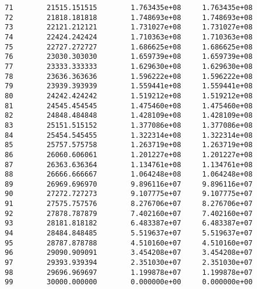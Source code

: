 \documentclass[11pt]{article}
\begin{document}
\begin{verbatim}
71        21515.151515        1.763435e+08     1.763435e+08   
72        21818.181818        1.748693e+08     1.748693e+08   
73        22121.212121        1.731027e+08     1.731027e+08   
74        22424.242424        1.710363e+08     1.710363e+08   
75        22727.272727        1.686625e+08     1.686625e+08   
76        23030.303030        1.659739e+08     1.659739e+08   
77        23333.333333        1.629630e+08     1.629630e+08   
78        23636.363636        1.596222e+08     1.596222e+08   
79        23939.393939        1.559441e+08     1.559441e+08   
80        24242.424242        1.519212e+08     1.519212e+08   
81        24545.454545        1.475460e+08     1.475460e+08   
82        24848.484848        1.428109e+08     1.428109e+08   
83        25151.515152        1.377086e+08     1.377086e+08   
84        25454.545455        1.322314e+08     1.322314e+08   
85        25757.575758        1.263719e+08     1.263719e+08   
86        26060.606061        1.201227e+08     1.201227e+08   
87        26363.636364        1.134761e+08     1.134761e+08   
88        26666.666667        1.064248e+08     1.064248e+08   
89        26969.696970        9.896116e+07     9.896116e+07   
90        27272.727273        9.107775e+07     9.107775e+07   
91        27575.757576        8.276706e+07     8.276706e+07   
92        27878.787879        7.402160e+07     7.402160e+07   
93        28181.818182        6.483387e+07     6.483387e+07   
94        28484.848485        5.519637e+07     5.519637e+07   
95        28787.878788        4.510160e+07     4.510160e+07   
96        29090.909091        3.454208e+07     3.454208e+07   
97        29393.939394        2.351030e+07     2.351030e+07   
98        29696.969697        1.199878e+07     1.199878e+07   
99        30000.000000        0.000000e+00     0.000000e+00   


\end{verbatim}
\end{document}
